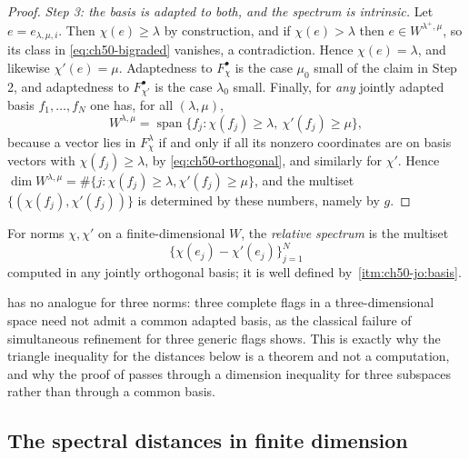 \begin{proof}
\emph{Step 3: the basis is adapted to both, and the spectrum is
intrinsic.}  Let $e=e_{\lambda,\mu,i}$.  Then $\chi(e)\ge\lambda$ by
construction, and if $\chi(e)>\lambda$ then $e\in W^{\lambda^+,\mu}$,
so its class in \eqref{eq:ch50-bigraded} vanishes, a contradiction.  Hence
$\chi(e)=\lambda$, and likewise $\chi'(e)=\mu$.  Adaptedness to
$F^\bullet_\chi$ is the case $\mu_0$ small of the claim in Step 2, and
adaptedness to $F^\bullet_{\chi'}$ is the case $\lambda_0$ small.
Finally, for \emph{any} jointly adapted basis $f_1,\dots,f_N$ one has,
for all $(\lambda,\mu)$,
\[
 W^{\lambda,\mu}
 =\operatorname{span}\{f_j:\chi(f_j)\ge\lambda,\ \chi'(f_j)\ge\mu\},
\]
because a vector lies in $F^\lambda_\chi$ if and only if all its nonzero
coordinates are on basis vectors with $\chi(f_j)\ge\lambda$, by
\eqref{eq:ch50-orthogonal}, and similarly for $\chi'$.  Hence
$\dim W^{\lambda,\mu}=\#\{j:\chi(f_j)\ge\lambda,\chi'(f_j)\ge\mu\}$, and
the multiset $\{(\chi(f_j),\chi'(f_j))\}$ is determined by these numbers,
namely by $g$.
\end{proof}

\begin{definition}
\label{def:ch50-relative-spectrum}
For norms $\chi,\chi'$ on a finite-dimensional $W$, the
\emph{relative spectrum} is the multiset
\[
 \{\chi(e_j)-\chi'(e_j)\}_{j=1}^N
\]
computed in any jointly orthogonal basis; it is well defined by
\,\cref{itm:ch50-jo:basis}.
\end{definition}

\begin{remark}
\label{rem:ch50-three-flags}
 has no analogue for three norms: three
complete flags in a three-dimensional space need not admit a common adapted
basis, as the classical failure of simultaneous refinement for three
generic flags shows.  This is exactly why the triangle inequality for the
distances below is a theorem and not a computation, and why the proof of
 passes through a dimension inequality for three
subspaces rather than through a common basis.
\end{remark}

\subsection{The spectral distances in finite dimension}
\label{sec:ch50-dp-finite}

